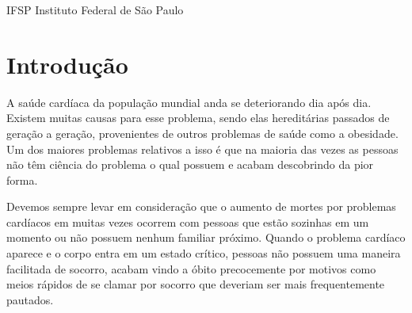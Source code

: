 \documentclass[
	12pt,				%
	openright,			%
	twoside,			%
	a4paper,			%
	english,			%
	french,				%
	spanish,			%
	brazil				%
]{abntex2}
\begin{document}
\listoffigures*
\cleardoublepage

\listoftables*
{}
\cleardoublepage

\begin{siglas}
  \item[IFSP] Instituto Federal de São Paulo
\end{siglas}



\tableofcontents*
\cleardoublepage



\textual

\chapter{Introdução}

A saúde cardíaca da população mundial anda se deteriorando dia após dia. Existem muitas causas para esse problema, sendo elas hereditárias passados de geração a geração, provenientes de outros problemas de saúde como a obesidade. Um dos maiores problemas relativos a isso é que na maioria das vezes as pessoas não têm ciência do problema o qual possuem e acabam descobrindo da pior forma.

Devemos sempre levar em consideração que o aumento de mortes por problemas cardíacos em muitas vezes ocorrem com pessoas que estão sozinhas em um momento ou não possuem nenhum familiar próximo. Quando o problema cardíaco aparece e o corpo entra em um estado crítico, pessoas não possuem uma maneira facilitada de socorro, acabam vindo a óbito precocemente por motivos como meios rápidos de se clamar por socorro que deveriam ser mais frequentemente pautados.
\end{document}
